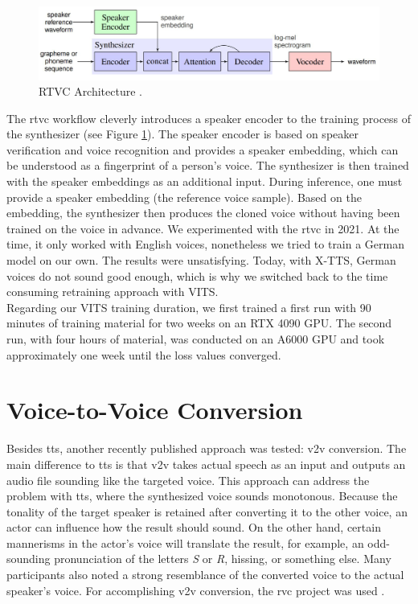 \documentclass[
  a4paper,  %
  twoside,  %
  bibliography=totoc,
  headsepline,
  cleardoublepage=empty,
  parskip=half,
  draft=false
]{scrbook}
\begin{document}
\begin{figure}[h]
  \centering
  \includegraphics[width=1\textwidth]{./graphics/rtvc.png}
  \caption{RTVC Architecture \cite{jemineRealTimeVoiceCloning2019}.}
  \label{fig:rtvc-arch}
\end{figure}

The \gls{rtvc} workflow cleverly introduces a speaker encoder to the training process of the synthesizer (see Figure \ref{fig:rtvc-arch}). The speaker encoder is based on speaker verification and voice recognition and provides a speaker embedding, which can be understood as a fingerprint of a person's voice. The synthesizer is then trained with the speaker embeddings as an additional input. During inference, one must provide a speaker embedding (the reference voice sample). Based on the embedding, the synthesizer then produces the cloned voice without having been trained on the voice in advance. We experimented with the \gls{rtvc} in 2021. At the time, it only worked with English voices, nonetheless we tried to train a German model on our own. The results were unsatisfying. Today, with X-TTS, German voices do not sound good enough, which is why we switched back to the time consuming retraining approach with VITS. \\
Regarding our VITS training duration, we first trained a first run with 90 minutes of training material for two weeks on an RTX 4090 GPU. The second run, with four hours of material, was conducted on an A6000 GPU and took approximately one week until the loss values converged. 

\section{Voice-to-Voice Conversion}
\label{sec:v2v}
Besides \gls{tts}, another recently published approach was tested: \gls{v2v} conversion. The main difference to \gls{tts} is that \gls{v2v} takes actual speech as an input and outputs an audio file sounding like the targeted voice. This approach can address the problem with \gls{tts}, where the synthesized voice sounds monotonous. Because the tonality of the target speaker is retained after converting it to the other voice, an actor can influence how the result should sound. On the other hand, certain mannerisms in the actor's voice will translate the result, for example, an odd-sounding pronunciation of the letters \textit{S} or \textit{R}, hissing, or something else. Many participants also noted a strong resemblance of the converted voice to the actual speaker's voice. For accomplishing \gls{v2v} conversion, the \gls{rvc} project was used \cite{RVCProjectRetrievalbasedVoiceConversionWebUI2023}. 
\end{document}
